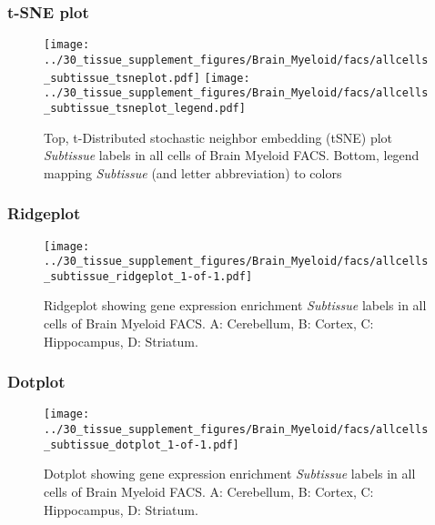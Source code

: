 \clearpage
\subsubsection{t-SNE plot}
\begin{figure}[h]
\centering
\texttt{[image: ../30\_tissue\_supplement\_figures/Brain\_Myeloid/facs/allcells\_subtissue\_tsneplot.pdf]}
\texttt{[image: ../30\_tissue\_supplement\_figures/Brain\_Myeloid/facs/allcells\_subtissue\_tsneplot\_legend.pdf]}
\caption{Top, t-Distributed stochastic neighbor embedding (tSNE) plot  \emph{Subtissue} labels in all cells of Brain Myeloid FACS. Bottom, legend mapping \emph{Subtissue} (and letter abbreviation) to colors}
\end{figure}


\clearpage

\subsubsection{Ridgeplot}
\begin{figure}[h]
\centering
\texttt{[image: ../30\_tissue\_supplement\_figures/Brain\_Myeloid/facs/allcells\_subtissue\_ridgeplot\_1-of-1.pdf]}

\caption{ Ridgeplot  showing gene expression enrichment \emph{Subtissue} labels in all cells of Brain Myeloid FACS. A: Cerebellum, B: Cortex, C: Hippocampus, D: Striatum.}
\end{figure}


\clearpage

\subsubsection{Dotplot}
\begin{figure}[h]
\centering
\texttt{[image: ../30\_tissue\_supplement\_figures/Brain\_Myeloid/facs/allcells\_subtissue\_dotplot\_1-of-1.pdf]}

\caption{ Dotplot  showing gene expression enrichment \emph{Subtissue} labels in all cells of Brain Myeloid FACS. A: Cerebellum, B: Cortex, C: Hippocampus, D: Striatum.}
\end{figure}

